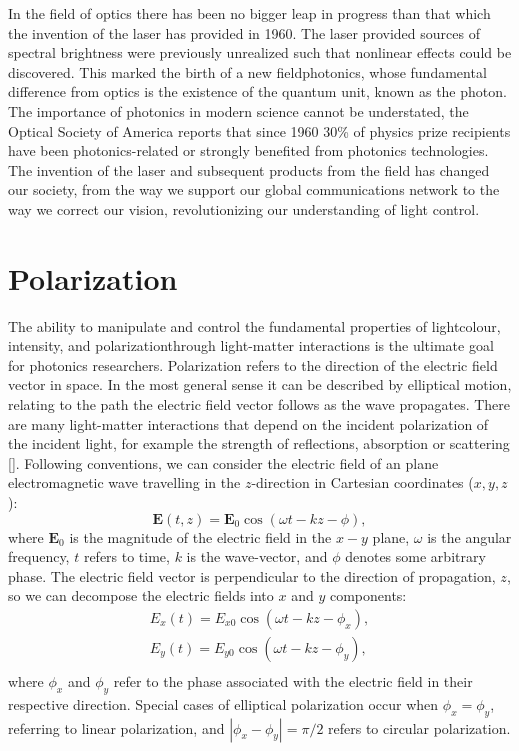 In the field of optics there has been no bigger leap in progress than that which the invention of the laser has provided in 1960. The laser provided sources of spectral brightness were previously unrealized such that nonlinear effects could be discovered. This marked the birth of a new field\textemdash photonics, whose fundamental difference from optics is the existence of the quantum unit, known as the photon. The importance of photonics in modern science cannot be understated, the Optical Society of America reports that since 1960 30\% of physics prize recipients have been photonics-related or strongly benefited from photonics technologies. The invention of the laser and subsequent products from the field has changed our society, from the way we support our global communications network to the way we correct our vision, revolutionizing our understanding of light control. 

\section{Polarization}
The ability to manipulate and control the fundamental properties of light\textemdash colour, intensity, and polarization\textemdash through light-matter interactions is the ultimate goal for photonics researchers. Polarization refers to the direction of the electric field vector in space. In the most general sense it can be described by elliptical motion, relating to the path the electric field vector follows as the wave propagates. There are many light-matter interactions that depend on the incident polarization of the incident light, for example the strength of reflections, absorption or scattering [\cite{Hulst}]. Following conventions, we can consider the electric field of an plane electromagnetic wave travelling in the $z$-direction in Cartesian coordinates ($x,y,z$):
\begin{equation}
\mathbf{E}(t, z) =\mathbf{E}_0 \cos(\omega t-kz-\phi),
\end{equation}where $\mathbf{E}_0$ is the magnitude of the electric field in the $x-y$ plane, $\omega$ is the angular frequency, $t$ refers to time, $k$ is the wave-vector, and $\phi$ denotes some arbitrary phase. The electric field vector is perpendicular to the direction of propagation, $z$, so we can decompose the electric fields into $x$ and $y$ components:
\begin{equation}
\begin{aligned}
E_x(t) = E_{x0} \cos(\omega t-kz-\phi_x),\\
E_y(t) = E_{y0} \cos(\omega t-kz-\phi_y),\\
\end{aligned}
\end{equation}
where $\phi_x$ and $\phi_y$ refer to the phase associated with the electric field in their respective direction. Special cases of elliptical polarization occur when $\phi_x = \phi_y$, referring to linear polarization, and $|\phi_x-\phi_y| = \pi/2$ refers to circular polarization.

